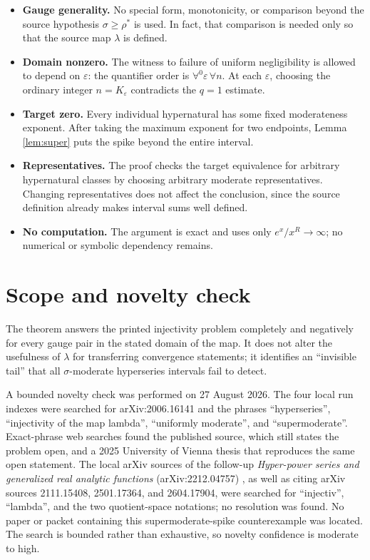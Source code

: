 \documentclass[11pt]{article}
\newcommand{\eps}{\varepsilon}
\begin{document}
\begin{itemize}
\item \textbf{Gauge generality.}  No special form, monotonicity, or comparison
beyond the source hypothesis $\sigma\geq\rho^*$ is used.  In fact, that
comparison is needed only so that the source map $\lambda$ is defined.
\item \textbf{Domain nonzero.}  The witness to failure of uniform
negligibility is allowed to depend on $\eps$: the quantifier order is
$\forall^0\eps\,\forall n$.  At each $\eps$, choosing the ordinary integer
$n=K_\eps$ contradicts the $q=1$ estimate.
\item \textbf{Target zero.}  Every individual hypernatural has some fixed
moderateness exponent.  After taking the maximum exponent for two endpoints,
Lemma \ref{lem:super} puts the spike beyond the entire interval.
\item \textbf{Representatives.}  The proof checks the target equivalence for
arbitrary hypernatural classes by choosing arbitrary moderate
representatives.  Changing representatives does not affect the conclusion,
since the source definition already makes interval sums well defined.
\item \textbf{No computation.}  The argument is exact and uses only
$e^x/x^R\to\infty$; no numerical or symbolic dependency remains.
\end{itemize}

\section{Scope and novelty check}

The theorem answers the printed injectivity problem completely and
negatively for every gauge pair in the stated domain of the map.  It does not
alter the usefulness of $\lambda$ for transferring convergence statements;
it identifies an ``invisible tail'' that all $\sigma$-moderate hyperseries
intervals fail to detect.

A bounded novelty check was performed on 27 August 2026.  The four local run
indexes were searched for arXiv:2006.16141 and the phrases ``hyperseries'',
``injectivity of the map lambda'', ``uniformly moderate'', and
``supermoderate''.  Exact-phrase web searches found the published source,
which still states the problem open, and a 2025 University of Vienna thesis
that reproduces the same open statement.  The local arXiv sources of the
follow-up \emph{Hyper-power series and generalized real analytic functions}
(arXiv:2212.04757) \cite{TMG}, as well as citing arXiv sources 2111.15408,
2501.17364, and 2604.17904, were searched for ``injectiv'', ``lambda'', and
the two quotient-space notations; no resolution was found.  No paper or
packet containing this supermoderate-spike counterexample was located.  The
search is bounded rather than exhaustive, so novelty confidence is moderate
to high.
\end{document}
